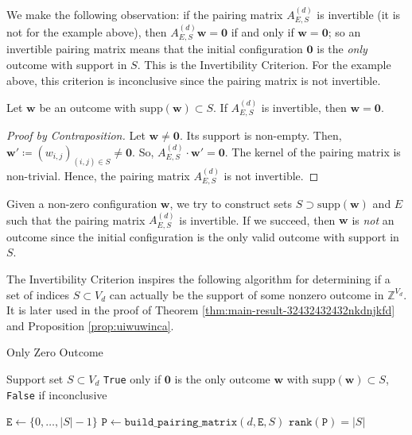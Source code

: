 We make the following observation: if the pairing matrix \( A^{(d)}_{E,S} \) is invertible (it is not for the example above), then \( A^{(d)}_{E,S} \mathbf w = \mathbf 0 \) if and only if \( \mathbf w = \mathbf 0 \); so an invertible pairing matrix means that the initial configuration \( \mathbf{0} \) is the \emph{only} outcome with support in \( S \). This is the Invertibility Criterion. For the example above, this criterion is inconclusive since the pairing matrix is not invertible.

\begin{proposition}
    Let \( \mathbf{w} \) be an outcome with \( \mathrm{supp}(\mathbf w) \subset S \).
    If \( A^{(d)}_{E,S} \) is invertible, then \( \mathbf{w} = \mathbf 0 \).
\end{proposition}

\begin{proof}[Proof by Contraposition]
    Let \( \mathbf{w} \neq \mathbf 0 \). Its support is non-empty. Then, \( \mathbf w' \coloneqq (w_{i,j})_{(i,j) \in S} \neq \mathbf 0 \). So, \( A^{(d)}_{E,S} \cdot \mathbf w' = \mathbf 0 \). The kernel of the pairing matrix is non-trivial. Hence, the pairing matrix \( A^{(d)}_{E,S} \) is not invertible.
\end{proof}

Given a non-zero configuration \( \mathbf{w} \), we try to construct sets \( S \supset \mathrm{supp}(\mathbf w) \) and \( E \) such that the pairing matrix \( A_{E,S}^{(d)} \) is invertible. If we succeed, then \( \mathbf{w} \) is \emph{not} an outcome since the initial configuration is the only valid outcome with support in \( S \). 


The Invertibility Criterion inspires the following algorithm for determining if a set of indices \( S \subset V_d \) can actually be the support of some nonzero outcome in \( \mathbb{Z}^{V_d} \). It is later used in the proof of Theorem \ref{thm:main-result-32432432432nkdnjkfd} and Proposition \ref{prop:uiwuwinca}.

\begin{algorithm}[H]
\caption{Only Zero Outcome}\label{alg:hyperfield_criterion:is_zero}
    \begin{algorithmic}[1]
    \Require Support set $S \subset {V_d}$
    \Ensure \texttt{True} only if \( \mathbf{0} \) is the only outcome \( \mathbf{w} \) with \( \mathrm{supp}(\mathbf{w}) \subset S \), \texttt{False} if inconclusive

    \State $\texttt{E} \gets \{0, \dots, |{S}| - 1\}$
    \State $\texttt{P} \gets \texttt{build\_pairing\_matrix}(d, \texttt{E}, S)$    
    \State \Return $\texttt{rank}(\texttt{P}) = |S|$
    \end{algorithmic}  
\end{algorithm}

